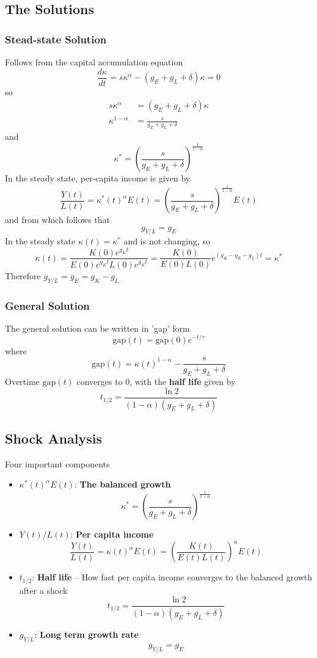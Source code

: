 \documentclass[a4paper]{article}
\begin{document}
\subsection{The Solutions}

\subsubsection*{Stead-state Solution}
Follows from the capital accumulation equation
\[ \frac{d\kappa}{dt} = s\kappa^\alpha - (g_E + g_L + \delta)\kappa = 0 \]
so \begin{align*}
    s\kappa^\alpha &= (g_E + g_L + \delta)\kappa \\
    \kappa^{1-\alpha} &= \frac{s}{g_E + g_L + \delta}
\end{align*}
and
\begin{equation*}
    \boxed{\kappa^* = (\frac{s}{g_E + g_L + \delta})^\frac{1}{1 - \alpha}}
\end{equation*}
In the steady state, per-capita income is given by
\[ \frac{Y(t)}{L(t)}  = \kappa^*(t)^\alpha E(t) = (\frac{s}{g_E + g_L + \delta})^\frac{1}{1 - \alpha}E(t) \]
and from which follows that
\[ g_{Y/L} = g_E \]
In the steady state $\kappa(t) = \kappa^*$ and is not changing, so
\[ \kappa(t) = \frac{K(0)e^{g_Kt}}{E(0)e^{g_Kt}L(0)e^{g_Kt}} 
= \frac{K(0)}{E(0)L(0)}e^{(g_K-g_E-g_L)t} = \kappa^* \]
Therefore $g_{Y/L} = g_E = g_K - g_L$

\subsubsection*{General Solution}
The general solution can be written in 'gap' form
\[ \text{gap}(t) = \text{gap}(0)e^{-t/\tau} \]
where
\[ \text{gap}(t) = \kappa(t)^{1-\alpha} - \frac{s}{g_E + g_L + \delta} \]
Overtime $\text{gap}(t)$ converges to 0, with the \textbf{half life} given by
\[ \boxed{t_{1/2} = \frac{\ln 2}{(1 - \alpha)(g_E + g_L + \delta)}} \]

\subsection{Shock Analysis}
Four important components\begin{itemize}
    \item $\kappa^*(t)^\alpha E(t)$: \textbf{The balanced growth} 
    \[\kappa^* = (\frac{s}{g_E + g_L + \delta})^\frac{1}{1 - \alpha}\]
    \item $Y(t)/L(t)$: \textbf{Per capita income}
    \[ \frac{Y(t)}{L(t)} = \kappa(t)^\alpha E(t) = (\frac{K(t)}{E(t)L(t)})^\alpha E(t) \]
    \item $t_{1/2}$: \textbf{Half life} -- How fast per capita income converges to the 
    balanced growth after a shock
    \[ t_{1/2} = \frac{\ln 2}{(1 - \alpha)(g_E + g_L + \delta)} \]
    \item $g_{Y/L}$: \textbf{Long term growth rate}
    \[ g_{Y/L} = g_E \]
\end{itemize}
\end{document}
